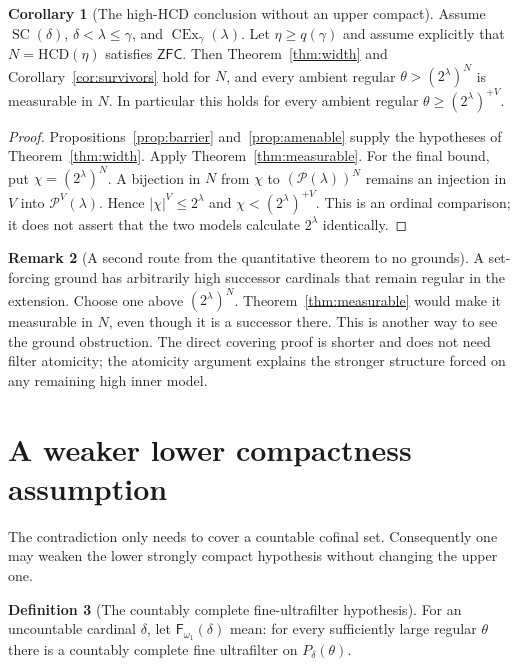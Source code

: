 \documentclass[11pt,letterpaper]{article}
\theoremstyle{definition}
\newtheorem{definition}{Definition}[section]
\newtheorem{corollary}[definition]{Corollary}
\newtheorem{remark}[definition]{Remark}
\numberwithin{equation}{section}
\newcommand{\ZFC}{\mathsf{ZFC}}
\newcommand{\HCD}{\mathrm{HCD}}
\newcommand{\SC}{\operatorname{SC}}
\newcommand{\CEx}{\operatorname{CEx}}
\newcommand{\calP}{\mathcal P}
\newcommand{\Ffine}{\mathsf{F}_{\omega_1}}
\begin{document}
\begin{corollary}[The high-$\HCD$ conclusion without an upper compact]\label{cor:HCDmeasurable}
Assume $\SC(\delta)$, $\delta<\lambda\le\gamma$, and
$\CEx_\gamma(\lambda)$. Let $\eta\ge q(\gamma)$ and assume explicitly
that $N=\HCD(\eta)$ satisfies $\ZFC$. Then
Theorem~\ref{thm:width} and Corollary~\ref{cor:survivors} hold for $N$,
and every ambient regular $\theta>(2^\lambda)^N$ is measurable in $N$.
In particular this holds for every ambient regular
$\theta\ge(2^\lambda)^{+V}$.
\end{corollary}
\begin{proof}
Propositions~\ref{prop:barrier} and~\ref{prop:amenable} supply the
hypotheses of Theorem~\ref{thm:width}. Apply
Theorem~\ref{thm:measurable}.
For the final bound, put $\chi=(2^\lambda)^N$. A bijection in $N$
from $\chi$ to $(\calP(\lambda))^N$ remains an injection in $V$ into
$\calP^V(\lambda)$. Hence $|\chi|^V\le 2^\lambda$ and
$\chi<(2^\lambda)^{+V}$. This is an ordinal comparison; it does not
assert that the two models calculate $2^\lambda$ identically.
\end{proof}

\begin{remark}[A second route from the quantitative theorem to no grounds]
A set-forcing ground has arbitrarily high successor cardinals that
remain regular in the extension. Choose one above $(2^\lambda)^N$.
Theorem~\ref{thm:measurable} would make it measurable in $N$, even
though it is a successor there. This is another way to see the ground
obstruction. The direct covering proof is shorter and does not need
filter atomicity; the atomicity argument explains the stronger
structure forced on any remaining high inner model.
\end{remark}

\section{A weaker lower compactness assumption}\label{sec:weaker}

The contradiction only needs to cover a countable cofinal set.
Consequently one may weaken the lower strongly compact hypothesis
without changing the upper one.

\begin{definition}[The countably complete fine-ultrafilter hypothesis]
For an uncountable cardinal $\delta$, let $\Ffine(\delta)$ mean:
for every sufficiently large regular $\theta$ there is a countably
complete fine ultrafilter on $P_\delta(\theta)$.
\end{definition}
\end{document}
